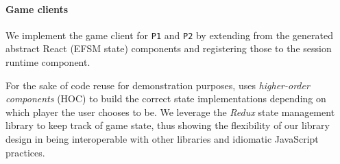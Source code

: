 \paragraph{Game clients}
We implement the game client for \texttt{P1} and
\texttt{P2} by extending from the generated abstract React (EFSM state)
components and registering those to the session runtime component.

For the sake of code reuse for demonstration purposes, \cite{NoughtsAndCrosses}
uses \textit{higher-order components} (HOC) to build the correct state
implementations depending on which player the user chooses to be.
We leverage the \textit{Redux} \cite{Redux} state management library to keep track of game
state, thus showing the flexibility of our library design in being
interoperable with other libraries and idiomatic JavaScript practices.

